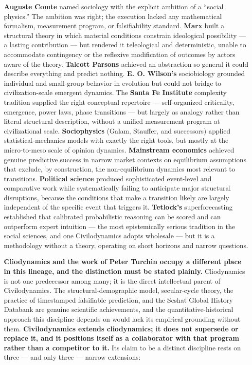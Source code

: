 \documentclass[
]{article}
\begin{document}
\textbf{Auguste Comte} named sociology with the explicit ambition of a
``social physics.'' The ambition was right; the execution lacked any
mathematical formalism, measurement program, or falsifiability standard.
\textbf{Marx} built a structural theory in which material conditions
constrain ideological possibility --- a lasting contribution --- but
rendered it teleological and deterministic, unable to accommodate
contingency or the reflexive modification of outcomes by actors aware of
the theory. \textbf{Talcott Parsons} achieved an abstraction so general
it could describe everything and predict nothing. \textbf{E. O.
Wilson's} sociobiology grounded individual and small-group behavior in
evolution but could not bridge to civilization-scale emergent dynamics.
The \textbf{Santa Fe Institute} complexity tradition supplied the right
conceptual repertoire --- self-organized criticality, emergence, power
laws, phase transitions --- but largely as analogy rather than literal
structural description, without a unified measurement program at
civilizational scale. \textbf{Sociophysics} (Galam, Stauffer, and
successors) applied statistical-mechanics models with exactly the right
tools, but mostly at the micro-to-meso scale of opinion dynamics.
\textbf{Mainstream economics} achieved genuine predictive success in
narrow market contexts on equilibrium assumptions that exclude, by
construction, the non-equilibrium dynamics most relevant to transitions.
\textbf{Political science} produced sophisticated event-level and
comparative work while systematically failing to anticipate major
structural disruptions, because the conditions that make a transition
likely are largely independent of the specific event that triggers it.
\textbf{Tetlock's} superforecasting established that calibrated
probabilistic reasoning can be scored and can outperform expert
intuition --- the most epistemically serious tradition in the social
sciences, and one Civilodynamics adopts wholesale --- but it is a
methodology without a theory, operating on short horizons and narrow
questions.

\textbf{Cliodynamics and the work of Peter Turchin occupy a different
place in this lineage, and the distinction must be stated plainly.}
Cliodynamics is not one predecessor among many; it is the direct
intellectual parent of Civilodynamics. The structural-demographic model,
secular-cycle theory, the practice of timestamped falsifiable
prediction, and the Seshat Global History Databank are genuine
scientific achievements, and the quantitative-historical approach this
discipline depends on would lack its empirical grounding without them.
\textbf{Civilodynamics extends cliodynamics; it does not supersede or
replace it, and it positions itself as a collaborator with that program
rather than a competitor to it.} Its claim to be a distinct discipline
rests on three --- and only three --- narrow extensions:
\end{document}
